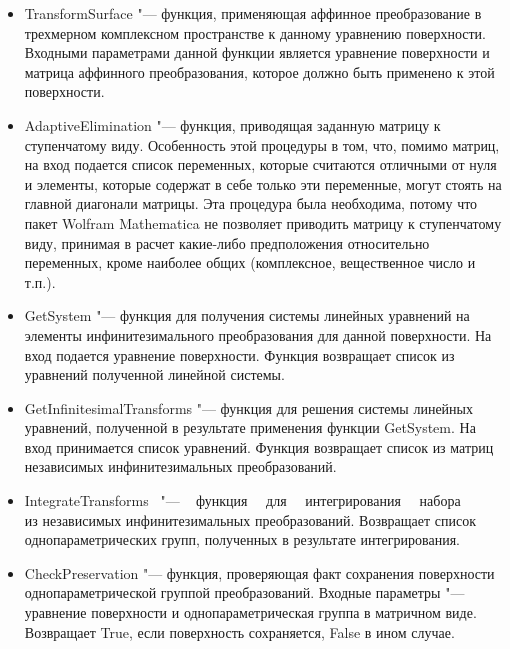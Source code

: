 \documentclass[../main.tex]{subfiles}
\begin{document}
\begin{itemize}

\item {\ttfamily TransformSurface} "--- функция, применяющая аффинное преобразование в трехмерном комплексном пространстве к данному уравнению поверхности. Входными параметрами данной функции является уравнение поверхности и матрица аффинного преобразования, которое должно быть применено к этой поверхности.

\item {\ttfamily AdaptiveElimination} "--- функция, приводящая заданную матрицу к ступенчатому виду. Особенность этой процедуры в том, что, помимо матриц, на вход подается список переменных, которые считаются отличными от нуля и элементы, которые содержат в себе только эти переменные, могут стоять на главной диагонали матрицы. Эта процедура была необходима, потому что пакет {\ttfamily Wolfram Mathematica} не позволяет приводить матрицу к ступенчатому виду, принимая в расчет какие-либо предположения относительно переменных, кроме наиболее общих (комплексное, вещественное число и т.п.).

\item {\ttfamily GetSystem} "---  функция для получения системы линейных уравнений на элементы инфинитезимального преобразования для данной поверхности. На вход подается уравнение поверхности. Функция возвращает список из уравнений полученной линейной системы.

\item {\ttfamily GetInfinitesimalTransforms} "--- функция для решения системы линейных уравнений, полученной в результате применения функции {\ttfamily GetSystem}. На вход принимается список уравнений. Функция возвращает список из матриц независимых инфинитезимальных преобразований.

\item {\ttfamily IntegrateTransforms}~ "--- ~ функция~~ для ~~интегрирования ~~набора\\ из независимых инфинитезимальных преобразований. Возвращает список однопараметрических групп, полученных в результате интегрирования.

\item {\ttfamily CheckPreservation} "--- функция, проверяющая факт сохранения поверхности однопараметрической группой преобразований. Входные параметры "--- уравнение поверхности и однопараметрическая группа в матричном виде. Возвращает {\ttfamily True}, если поверхность сохраняется, {\ttfamily False} в ином случае.

\end{itemize}
\end{document}
